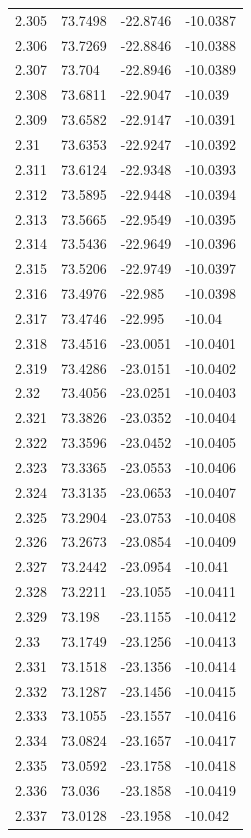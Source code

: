 \begin{tabular}{llll}
2.305 & 73.7498 & -22.8746 & -10.0387 \\
2.306 & 73.7269 & -22.8846 & -10.0388 \\
2.307 & 73.704 & -22.8946 & -10.0389 \\
2.308 & 73.6811 & -22.9047 & -10.039 \\
2.309 & 73.6582 & -22.9147 & -10.0391 \\
2.31 & 73.6353 & -22.9247 & -10.0392 \\
2.311 & 73.6124 & -22.9348 & -10.0393 \\
2.312 & 73.5895 & -22.9448 & -10.0394 \\
2.313 & 73.5665 & -22.9549 & -10.0395 \\
2.314 & 73.5436 & -22.9649 & -10.0396 \\
2.315 & 73.5206 & -22.9749 & -10.0397 \\
2.316 & 73.4976 & -22.985 & -10.0398 \\
2.317 & 73.4746 & -22.995 & -10.04 \\
2.318 & 73.4516 & -23.0051 & -10.0401 \\
2.319 & 73.4286 & -23.0151 & -10.0402 \\
2.32 & 73.4056 & -23.0251 & -10.0403 \\
2.321 & 73.3826 & -23.0352 & -10.0404 \\
2.322 & 73.3596 & -23.0452 & -10.0405 \\
2.323 & 73.3365 & -23.0553 & -10.0406 \\
2.324 & 73.3135 & -23.0653 & -10.0407 \\
2.325 & 73.2904 & -23.0753 & -10.0408 \\
2.326 & 73.2673 & -23.0854 & -10.0409 \\
2.327 & 73.2442 & -23.0954 & -10.041 \\
2.328 & 73.2211 & -23.1055 & -10.0411 \\
2.329 & 73.198 & -23.1155 & -10.0412 \\
2.33 & 73.1749 & -23.1256 & -10.0413 \\
2.331 & 73.1518 & -23.1356 & -10.0414 \\
2.332 & 73.1287 & -23.1456 & -10.0415 \\
2.333 & 73.1055 & -23.1557 & -10.0416 \\
2.334 & 73.0824 & -23.1657 & -10.0417 \\
2.335 & 73.0592 & -23.1758 & -10.0418 \\
2.336 & 73.036 & -23.1858 & -10.0419 \\
2.337 & 73.0128 & -23.1958 & -10.042 \\

\end{tabular}
